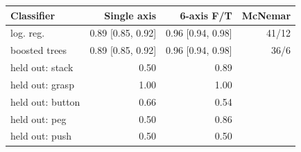 \begin{tabular}{lrrr}
\toprule
Classifier & Single axis & 6-axis F/T & McNemar \\
\midrule
log. reg. & 0.89 [0.85, 0.92] & 0.96 [0.94, 0.98] & 41/12 \\
boosted trees & 0.89 [0.85, 0.92] & 0.96 [0.94, 0.98] & 36/6 \\
held out: stack & 0.50 & 0.89 &  \\
held out: grasp & 1.00 & 1.00 &  \\
held out: button & 0.66 & 0.54 &  \\
held out: peg & 0.50 & 0.86 &  \\
held out: push & 0.50 & 0.50 &  \\
\bottomrule
\end{tabular}
